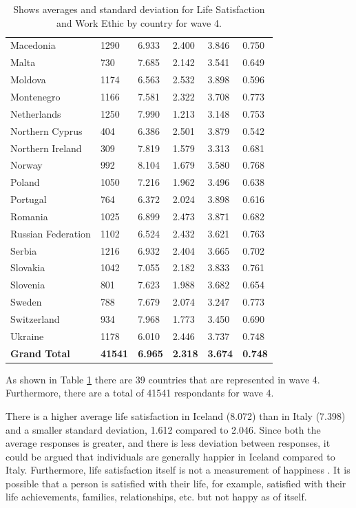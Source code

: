 \documentclass[11pt,a4paper]{article}
\newcommand{\parspace}{\par\vspace{1em}}
\begin{document}
\begin{table}[h!]
{\begin{tabular}{@{}llllll@{}}
Macedonia          & 1290 & 6.933 & 2.400 & 3.846 & 0.750 \\
Malta              & 730  & 7.685 & 2.142 & 3.541 & 0.649 \\
Moldova            & 1174 & 6.563 & 2.532 & 3.898 & 0.596 \\
Montenegro         & 1166 & 7.581 & 2.322 & 3.708 & 0.773 \\
Netherlands        & 1250 & 7.990 & 1.213 & 3.148 & 0.753 \\
Northern Cyprus    & 404  & 6.386 & 2.501 & 3.879 & 0.542 \\
Northern Ireland   & 309  & 7.819 & 1.579 & 3.313 & 0.681 \\
Norway             & 992  & 8.104 & 1.679 & 3.580 & 0.768 \\
Poland             & 1050 & 7.216 & 1.962 & 3.496 & 0.638 \\
Portugal           & 764  & 6.372 & 2.024 & 3.898 & 0.616 \\
Romania            & 1025 & 6.899 & 2.473 & 3.871 & 0.682 \\
Russian Federation & 1102 & 6.524 & 2.432 & 3.621 & 0.763 \\
Serbia             & 1216 & 6.932 & 2.404 & 3.665 & 0.702 \\
Slovakia           & 1042 & 7.055 & 2.182 & 3.833 & 0.761 \\
Slovenia           & 801  & 7.623 & 1.988 & 3.682 & 0.654 \\
Sweden             & 788  & 7.679 & 2.074 & 3.247 & 0.773 \\
Switzerland        & 934  & 7.968 & 1.773 & 3.450 & 0.690 \\
Ukraine            & 1178 & 6.010 & 2.446 & 3.737 & 0.748 \\
\rowcolor[HTML]{D9D9D9} 
\textbf{Grand Total} & \textbf{41541} & \textbf{6.965}                  &
\textbf{2.318}                    & \textbf{3.674}           & \textbf{0.748}
\\ \end{tabular}%
}
\caption{Shows averages and standard deviation for Life Satisfaction and Work
  Ethic by country for wave 4.}
\label{tab:Q1_2}
\end{table}  

\noindent As shown in Table \ref{tab:Q1_2} there are 39 countries that are
represented in wave 4. Furthermore, there are a total of 41541 respondants for
wave 4. \parspace

\noindent There is a higher average life satisfaction in Iceland (8.072) than in Italy
(7.398) and a smaller standard deviation, 1.612 compared to 2.046. Since both
the average responses is greater, and there is less deviation between
responses, it could be argued that individuals are generally happier in Iceland
compared to Italy. Furthermore, life satisfaction itself is not a measurement of
happiness \citep{happiness}. It is possible that a person is satisfied with
their life, for example, satisfied with their life achievements, families,
relationships, etc. but not happy as of itself. 
\end{document}
